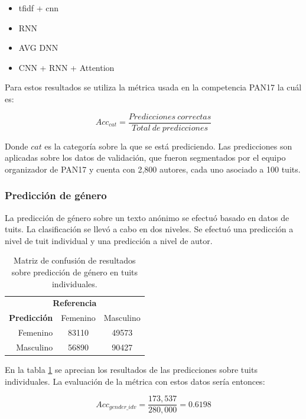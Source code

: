 \begin{itemize}
\item \gls{tfidf} + \gls{cnn} \parencite{schaetti2017author}
\item RNN \parencite{kodiyan2017author}
\item AVG DNN \parencite{franco2017author}
\item CNN + RNN + Attention \parencite{miura2017author}
\end{itemize}

Para estos resultados se utiliza la métrica usada en la competencia PAN17 la cuál es:


$$ Acc_{cat} = \frac{Predicciones\: correctas}{Total\: de\: predicciones} $$

Donde $cat$ es la categoría sobre la que se está prediciendo. Las predicciones son aplicadas sobre los datos de validación, que fueron segmentados por el equipo organizador de PAN17 y cuenta con 2,800 autores, cada uno asociado a 100 tuits.

\subsubsection{Predicción de género}

La predicción de género sobre un texto anónimo se efectuó basado en datos de tuits. La clasificación se llevó a cabo en dos niveles. Se efectuó una predicción a nivel de tuit individual y una predicción a nivel de autor.

\begin{table}
\centering
\begin{tabular}{r | c c}
\multicolumn{3}{c}{\textbf{Referencia}} \\
\textbf{Predicción} & Femenino & Masculino \\
\hline
Femenino & 83110 & 49573 \\
Masculino & 56890 & 90427 \\
\end{tabular}
\caption{Matriz de confusión de resultados sobre predicción de género en tuits individuales.}
\label{tab:gender_indvtweet}
\end{table}

En la tabla \ref{tab:gender_indvtweet} se aprecian los resultados de las predicciones sobre tuits individuales. La evaluación de la métrica con estos datos sería entonces:

$$ Acc_{gender\_idv} = \frac{173,537}{280,000} = 0\text{.}6198 $$

